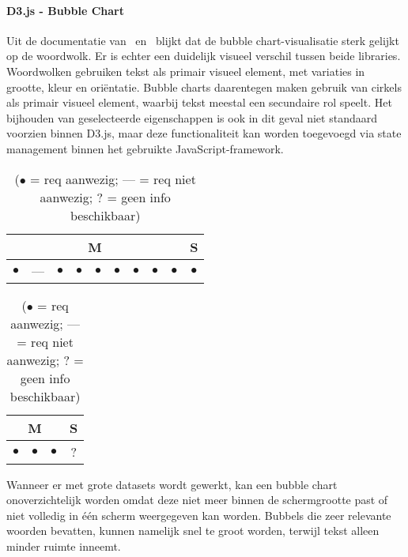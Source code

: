 \paragraph{D3.js - Bubble Chart}
Uit de documentatie van~\textcite{D3Contributors2025} en~\textcite{Mike2025a} blijkt dat de bubble chart-visualisatie sterk gelijkt op de woordwolk. Er is echter een duidelijk visueel verschil tussen beide libraries. Woordwolken gebruiken tekst als primair visueel element, met variaties in grootte, kleur en oriëntatie. Bubble charts daarentegen maken gebruik van cirkels als primair visueel element, waarbij tekst meestal een secundaire rol speelt. Het bijhouden van geselecteerde eigenschappen is ook in dit geval niet standaard voorzien binnen D3.js, maar deze functionaliteit kan worden toegevoegd via state management binnen het gebruikte JavaScript-framework.

\begin{table}[htbp]
    \centering
    \begin{minipage}{0.48\textwidth}
        \centering
        \begin{tabular}{|ccccccccc|c|}
            \hline
            \multicolumn{9}{|c|}{M} & \multicolumn{1}{c|}{S} \\
            \midrule
            $\bullet$ & --- & $\bullet$ & $\bullet$ & $\bullet$ & $\bullet$ & $\bullet$ & $\bullet$ & $\bullet$ & $\bullet$ \\
            \bottomrule
        \end{tabular}
        \caption{D3.js Bubble Chart - Functionele requirements}
    \end{minipage}
    \hfill
    \begin{minipage}{0.48\textwidth}
        \centering
        \begin{tabular}{|ccc|c|}
            \hline
            \multicolumn{3}{|c|}{M} & \multicolumn{1}{c|}{S} \\
            \midrule
            $\bullet$ & $\bullet$ & $\bullet$ & ? \\
            \bottomrule
        \end{tabular}
        \caption{D3.js Bubble Chart - Niet-functionele requirements}
    \end{minipage}
    \caption*{($\bullet$ = req aanwezig; --- = req niet aanwezig; ? = geen info beschikbaar)}
\end{table}

Wanneer er met grote datasets wordt gewerkt, kan een bubble chart onoverzichtelijk worden omdat deze niet meer binnen de schermgrootte past of niet volledig in één scherm weergegeven kan worden. Bubbels die zeer relevante woorden bevatten, kunnen namelijk snel te groot worden, terwijl tekst alleen minder ruimte inneemt.

